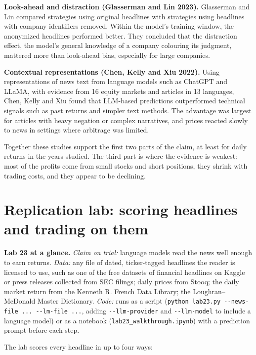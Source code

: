 \textbf{Look-ahead and distraction (Glasserman and Lin 2023).} Glasserman and Lin compared strategies using original headlines with strategies using headlines with company identifiers removed. Within the model's training window, the anonymized headlines performed better. They concluded that the distraction effect, the model's general knowledge of a company colouring its judgment, mattered more than look-ahead bias, especially for large companies.

\textbf{Contextual representations (Chen, Kelly and Xiu 2022).} Using representations of news text from language models such as ChatGPT and LLaMA, with evidence from 16 equity markets and articles in 13 languages, Chen, Kelly and Xiu found that LLM-based predictions outperformed technical signals such as past returns and simpler text methods. The advantage was largest for articles with heavy negation or complex narratives, and prices reacted slowly to news in settings where arbitrage was limited.

Together these studies support the first two parts of the claim, at least for daily returns in the years studied. The third part is where the evidence is weakest: most of the profits come from small stocks and short positions, they shrink with trading costs, and they appear to be declining.

\section{Replication lab: scoring headlines and trading on them}
\label{sec:23-lab}

\begin{callout}
\textbf{Lab 23 at a glance.} \emph{Claim on trial:} language models read the news well enough to earn returns. \emph{Data:} any file of dated, ticker-tagged headlines the reader is licensed to use, such as one of the free datasets of financial headlines on Kaggle or press releases collected from SEC filings; daily prices from Stooq; the daily market return from the Kenneth R. French Data Library; the Loughran--McDonald Master Dictionary. \emph{Code:} runs as a script (\texttt{python lab23.py -{}-news-file ... -{}-lm-file ...}, adding \texttt{-{}-llm-provider} and \texttt{-{}-llm-model} to include a language model) or as a notebook (\texttt{lab23\_walkthrough.ipynb}) with a prediction prompt before each step.
\end{callout}

The lab scores every headline in up to four ways:

